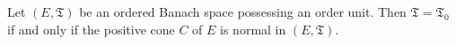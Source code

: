 Let $(E, \mathfrak{T})$ be an ordered Banach space possessing an order unit. Then $\mathfrak{T} = \mathfrak{T}_0$ if and only if the positive cone $C$ of $E$ is normal in $(E, \mathfrak{T})$.
